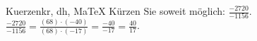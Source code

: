 \begin{MAufgabe}{Kuerzen}{kr, dh, MaTeX}
K\"urzen Sie soweit m\"oglich: $\frac{-2720}{-1156}$.\\ 
\ifLsg\MLoesung
\quad $\frac{-2720}{-1156}=\frac{(68)\cdot(-40)}{(68)\cdot(-17)}=\frac{-40}{-17}=\frac{40}{17}$.\else\relax\fi
 \end{MAufgabe}